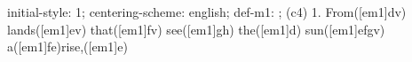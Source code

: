initial-style: 1;
centering-scheme: english;
def-m1: \grealign;
(c4) 1. From([em1]dv) lands([em1]ev) that([em1]fv) see([em1]gh) the([em1]d) sun([em1]efgv) a([em1]fe)rise,([em1]e)